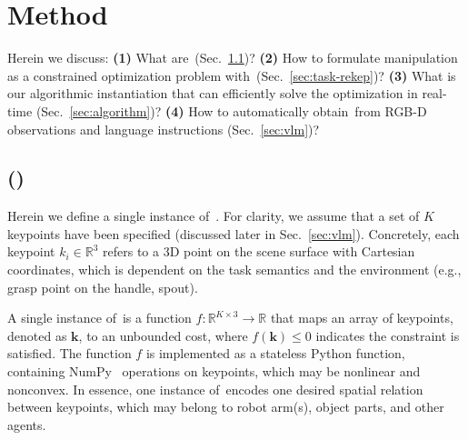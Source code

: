 \section{Method}\label{sec:method}

Herein we discuss:
\textbf{(1)} What are~\algname (Sec.~\ref{sec:rekep})?
\textbf{(2)} How to formulate manipulation as a constrained optimization problem with~\algabrvname (Sec.~\ref{sec:task-rekep})?
\textbf{(3)} What is our algorithmic instantiation that can efficiently solve the optimization in real-time (Sec.~\ref{sec:algorithm})?
\textbf{(4)} How to automatically obtain~\algabrvname from RGB-D observations and language instructions (Sec.~\ref{sec:vlm})?

\subsection{\algname (\algabrvname)}\label{sec:rekep}

Herein we define a single instance of~\algabrvname.
For clarity, we assume that a set of $K$ keypoints have been specified (discussed later in Sec.~\ref{sec:vlm}).
Concretely, each keypoint $k_i \in \mathbb{R}^3$ refers to a 3D point on the scene surface with Cartesian coordinates, which is dependent on the task semantics and the environment (e.g., grasp point on the handle, spout).

A single instance of~\algabrvname is a function $f: \mathbb{R}^{K \times 3} \rightarrow \mathbb{R}$ that maps an array of keypoints, denoted as $\bm{k}$, to an unbounded cost, where $f(\bm{k}) \leq 0$ indicates the constraint is satisfied. The function $f$ is implemented as a stateless Python function, containing NumPy~\cite{harris2020array} operations on keypoints, which may be nonlinear and nonconvex.
In essence, one instance of~\algabrvname encodes one desired spatial relation between keypoints, which may belong to robot arm(s), object parts, and other agents.

